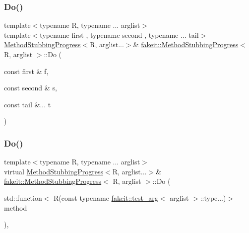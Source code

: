 \mbox{\label{structfakeit_1_1MethodStubbingProgress_a157561400e37da65c5b48f4466fc603c}} 
\subsubsection{\texorpdfstring{Do()}{Do()}\hspace{0.1cm}{\footnotesize\ttfamily [3/27]}}
{\footnotesize\ttfamily template$<$typename R, typename ... arglist$>$ \\
template$<$typename first , typename second , typename ... tail$>$ \\
\mbox{\hyperlink{structfakeit_1_1MethodStubbingProgress}{Method\+Stubbing\+Progress}}$<$R, arglist...$>$\& \mbox{\hyperlink{structfakeit_1_1MethodStubbingProgress}{fakeit\+::\+Method\+Stubbing\+Progress}}$<$ R, arglist $>$\+::Do (\begin{DoxyParamCaption}\item[{const first \&}]{f,  }\item[{const second \&}]{s,  }\item[{const tail \&...}]{t }\end{DoxyParamCaption})\hspace{0.3cm}{\ttfamily [inline]}}

\mbox{\label{structfakeit_1_1MethodStubbingProgress_a9ef4c2db8e567aa312b708613d240ae1}} 
\subsubsection{\texorpdfstring{Do()}{Do()}\hspace{0.1cm}{\footnotesize\ttfamily [4/27]}}
{\footnotesize\ttfamily template$<$typename R, typename ... arglist$>$ \\
virtual \mbox{\hyperlink{structfakeit_1_1MethodStubbingProgress}{Method\+Stubbing\+Progress}}$<$R, arglist...$>$\& \mbox{\hyperlink{structfakeit_1_1MethodStubbingProgress}{fakeit\+::\+Method\+Stubbing\+Progress}}$<$ R, arglist $>$\+::Do (\begin{DoxyParamCaption}\item[{std\+::function$<$ R(const typename \mbox{\hyperlink{structfakeit_1_1test__arg}{fakeit\+::test\+\_\+arg}}$<$ arglist $>$\+::type...)$>$}]{method }\end{DoxyParamCaption})\hspace{0.3cm}{\ttfamily [inline]}, {\ttfamily [virtual]}}

